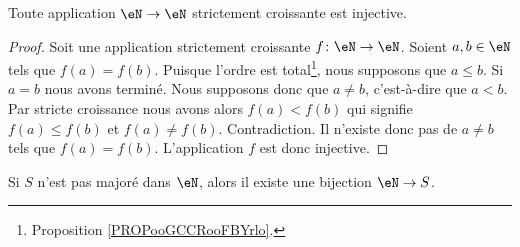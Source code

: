 \begin{proposition}     \label{PROPooFYMJooWihvhk}
	Toute application \( \eN\to \eN\) strictement croissante est injective.
\end{proposition}

\begin{proof}
	Soit une application strictement croissante \( f\colon \eN\to \eN\). Soient \( a,b\in \eN\) tels que \( f(a)=f(b)\). Puisque l'ordre est total\footnote{Proposition \ref{PROPooGCCRooFBYrlo}.}, nous supposons que \( a\leq b\). Si \( a=b\) nous avons terminé. Nous supposons donc que \( a\neq b\), c'est-à-dire que \( a<b\). Par stricte croissance nous avons alors \( f(a)<f(b)\) qui signifie \( f(a)\leq f(b)\) et \( f(a)\neq f(b)\). Contradiction. Il n'existe donc pas de \( a\neq b\) tels que \( f(a)=f(b)\). L'application \( f\) est donc injective.
\end{proof}

\begin{lemma}        \label{LEMooFKLPooPrmeUU}
	Si \( S\) n'est pas majoré dans \( \eN\), alors il existe une bijection \( \eN\to S\).
\end{lemma}

